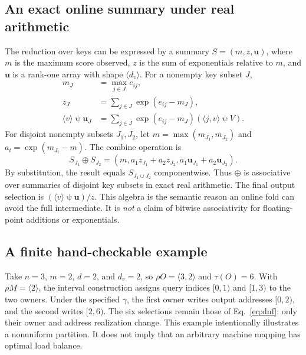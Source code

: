\documentclass[sigplan,10pt,review,balance=false,pbalance=false]{acmart}
\newcommand{\ps}{\mathbin{\psi}}
\begin{document}
\subsection{An exact online summary under real arithmetic}
The reduction over keys can be expressed by a summary $S=(m,z,\mathbf u)$, where $m$ is the maximum score observed, $z$ is the sum of exponentials relative to $m$, and $\mathbf u$ is a rank-one array with shape $\langle d_v\rangle$. For a nonempty key subset $J$,
\begin{align}
 m_J&=\max_{j\in J}e_{ij},\\
 z_J&=\sum_{j\in J}\exp(e_{ij}-m_J),\\
 \langle v\rangle\ps\mathbf u_J&=\sum_{j\in J}\exp(e_{ij}-m_J)
 (\langle j,v\rangle\ps V).
\end{align}
For disjoint nonempty subsets $J_1,J_2$, let $m=\max(m_{J_1},m_{J_2})$ and $a_t=\exp(m_{J_t}-m)$. The combine operation is
\begin{equation}
 S_{J_1}\oplus S_{J_2}=
 (m,a_1z_{J_1}+a_2z_{J_2},a_1\mathbf u_{J_1}+a_2\mathbf u_{J_2}).
 \label{eq:combine}
\end{equation}
By substitution, the result equals $S_{J_1\cup J_2}$ componentwise. Thus $\oplus$ is associative over summaries of disjoint key subsets in exact real arithmetic. The final output selection is $(\langle v\rangle\ps\mathbf u)/z$. This algebra is the semantic reason an online fold can avoid the full intermediate. It is \emph{not} a claim of bitwise associativity for floating-point additions or exponentials.

\subsection{A finite hand-checkable example}
Take $n=3$, $m=2$, $d=2$, and $d_v=2$, so $\rho O=\langle3,2\rangle$ and $\tau(O)=6$. With $\rho M=\langle2\rangle$, the interval construction assigns query indices $[0,1)$ and $[1,3)$ to the two owners. Under the specified $\gamma$, the first owner writes output addresses $[0,2)$, and the second writes $[2,6)$. The six selections remain those of Eq.~\eqref{eq:dnf}; only their owner and address realization change. This example intentionally illustrates a nonuniform partition. It does not imply that an arbitrary machine mapping has optimal load balance.
\end{document}
